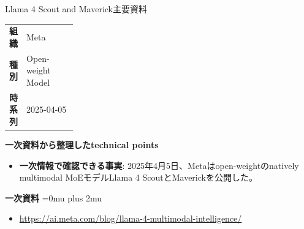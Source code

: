 \begin{technicalnote}{Llama 4 Scout and Maverick}{主要資料}
\begingroup
\begin{tabularx}{\linewidth}{@{}>{\bfseries}p{0.22\linewidth}X@{}}
組織 & Meta \\
種別 & Open-weight Model \\
時系列 & 2025-04-05 \\
\end{tabularx}
\smallskip
\begin{minipage}{\linewidth}
{\bfseries 一次資料から整理したtechnical points}
\begin{itemize}[leftmargin=1.5em,itemsep=0.35em]
\item \textbf{一次情報で確認できる事実}: 2025年4月5日、Metaはopen-weightのnatively multimodal MoEモデルLlama 4 ScoutとMaverickを公開した。
\end{itemize}
\begin{samepage}
{\bfseries 一次資料}
\begingroup\sloppy
\Urlmuskip=0mu plus 2mu\relax
\begin{itemize}[leftmargin=1.5em,itemsep=0.25em]
\item {\scriptsize\url{https://ai.meta.com/blog/llama-4-multimodal-intelligence/}}
\end{itemize}
\endgroup
\end{samepage}
\end{minipage}
\endgroup
\end{technicalnote}
\medskip


